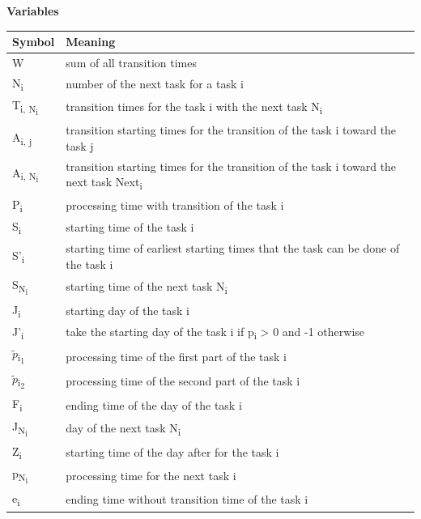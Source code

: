 \documentclass[fleqn,10pt]{wlscirep}
\begin{document}
\noindent \textbf{Variables}

\begin{table}[ht]
\centering
\begin{tabular}{|l|l|}
\hline
Symbol & Meaning \\
\hline
W & sum of all transition times \\
\hline
N\textsubscript{i} & number of the next task for a task i  \\
\hline
T\textsubscript{i, N\textsubscript{i}} & transition times for the task i with the next task N\textsubscript{i} \\
\hline
A\textsubscript{i, j} & transition starting times for the transition of the task i toward the task j  \\ %
\hline
A\textsubscript{i, N\textsubscript{i}} & transition starting times for the transition of the task i toward the next task Next\textsubscript{i}  \\ %
\hline
P\textsubscript{i} & processing time with transition of the task i  \\
\hline
S\textsubscript{i} & starting time of the task i  \\
\hline
S'\textsubscript{i} & starting time of earliest starting times that the task can be done of the task i  \\
\hline
S\textsubscript{N\textsubscript{i}} & starting time of the next task N\textsubscript{i}  \\
\hline
J\textsubscript{i} & starting day of the task i  \\
\hline
J'\textsubscript{i} & take the starting day of the task i if p\textsubscript{i} > 0 and -1 otherwise \\
\hline
$\tilde{p}$\textsubscript{i\textsubscript{1}}  & processing time of the first part of the task i \\
\hline
$\tilde{p}$\textsubscript{i\textsubscript{2}}  & processing time of the second part of the task i \\
\hline
F\textsubscript{i}  & ending time of the day of the task i \\
\hline
J\textsubscript{N\textsubscript{i}}  & day of the next task N\textsubscript{i} \\
\hline
Z\textsubscript{i}  & starting time of the day after for the task i \\
\hline
p\textsubscript{N\textsubscript{i}}  & processing time for the next task i \\
\hline
e\textsubscript{i}  & ending time without transition time of the task i \\

\end{tabular}
\end{table}
\end{document}
